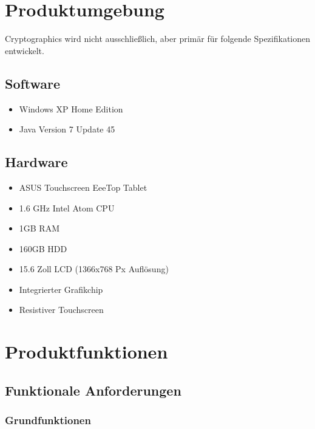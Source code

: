 \documentclass{article}
\begin{document}
\section{Produktumgebung}

\gls{Cryptographics} wird nicht ausschließlich, aber primär für folgende Spezifikationen entwickelt.

\subsection{Software}

\begin{itemize}
	\item Windows XP Home Edition
	\item Java Version 7 Update 45
\end{itemize}

\subsection{Hardware}

\begin{itemize}
	\item ASUS Touchscreen \gls{EeeTop} Tablet
	\item 1.6 GHz Intel Atom CPU
	\item 1GB RAM
	\item 160GB HDD
	\item 15.6 Zoll LCD (1366x768 Px Auflösung)
	\item Integrierter Grafikchip
	\item Resistiver Touchscreen
\end{itemize}

\section{Produktfunktionen}

\subsection{Funktionale Anforderungen}

\subsubsection{Grundfunktionen}
\end{document}
